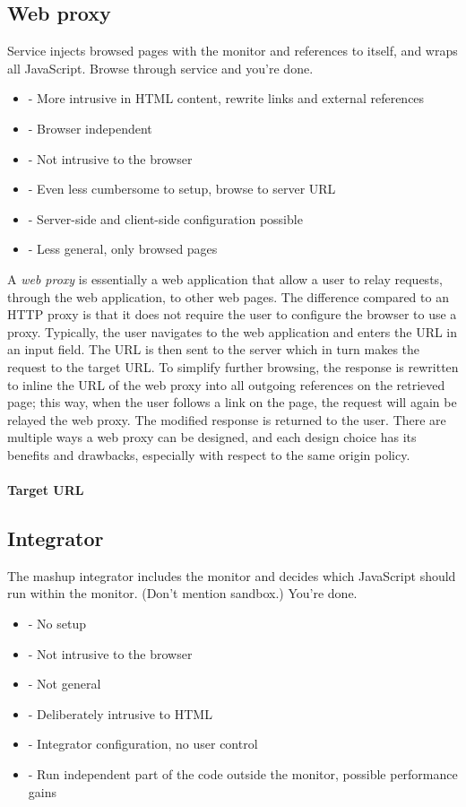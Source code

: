 \documentclass{llncs}
\begin{document}
\subsection{Web proxy}

Service injects browsed pages with the monitor and references to itself, and 
wraps all JavaScript. Browse through service and you're done.
\begin{itemize}
\item- More intrusive in HTML content, rewrite links and external references 
\item- Browser independent
\item- Not intrusive to the browser
\item- Even less cumbersome to setup, browse to server URL
\item- Server-side and client-side configuration possible
\item- Less general, only browsed pages
\end{itemize}


A \emph{web proxy} is essentially a web application that allow a user to relay requests, 
through the web application, to other web pages. The difference compared to an 
HTTP proxy is that it does not require the user to configure the browser to use a 
proxy. Typically, the user navigates to the web application and enters the URL in 
an input field. The URL is then sent to the server which in turn makes the request to the 
target URL. To simplify further 
browsing, the response is rewritten to inline the URL of the web proxy 
into all outgoing references on the retrieved page; this way, when the user 
follows a link on the page, the request will again be relayed the web proxy. 
The modified response is returned to the user. 
There are multiple ways a web proxy can be designed, and each design choice 
has its benefits and drawbacks, especially with respect to the same origin policy.

\paragraph{Target URL}

\subsection{Integrator}

The mashup integrator includes the monitor and decides which JavaScript should 
run within the monitor. (Don't mention sandbox.) You're done.
\begin{itemize}
\item- No setup
\item- Not intrusive to the browser
\item- Not general
\item- Deliberately intrusive to HTML
\item- Integrator configuration, no user control
\item- Run independent part of the code outside the monitor, possible performance gains
\end{itemize}
\end{document}
